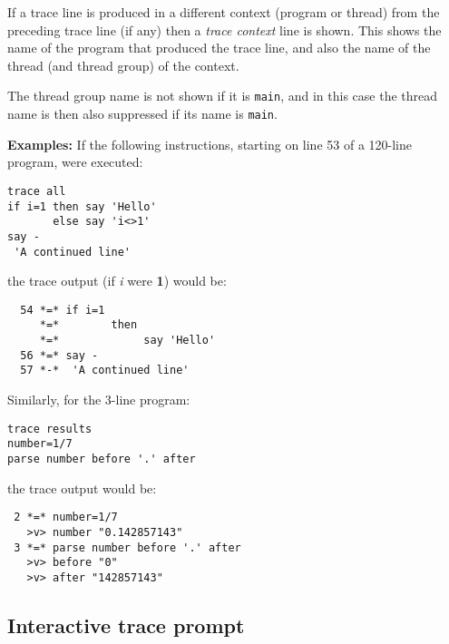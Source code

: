If a trace line is produced in a different context (program or thread)
from the preceding trace line (if any) then a \emph{trace context}
line is shown.  This shows the name of the program that produced the
trace line, and also the name of the thread (and thread group) of the
context.
 
The thread group name is not shown if it is \texttt{main}, and in this
case the thread name is then also suppressed if its name is \texttt{main}.
 
\textbf{Examples:}
 If the following instructions, starting on line 53 of a 120-line
program, were executed:
\begin{lstlisting}
trace all
if i=1 then say 'Hello'
       else say 'i<>1'
say -
 'A continued line'
\end{lstlisting}
the trace output (if \emph{i} were \textbf{1}) would be:
\begin{lstlisting}
  54 *=* if i=1
     *=*        then
     *=*             say 'Hello'
  56 *=* say -
  57 *-*  'A continued line'
\end{lstlisting}
 Similarly, for the 3-line program:
\begin{lstlisting}
trace results
number=1/7
parse number before '.' after
\end{lstlisting}
the trace output would be:
\begin{lstlisting}
 2 *=* number=1/7
   >v> number "0.142857143"
 3 *=* parse number before '.' after
   >v> before "0"
   >v> after "142857143"
\end{lstlisting}
\subsection{Interactive trace prompt}

